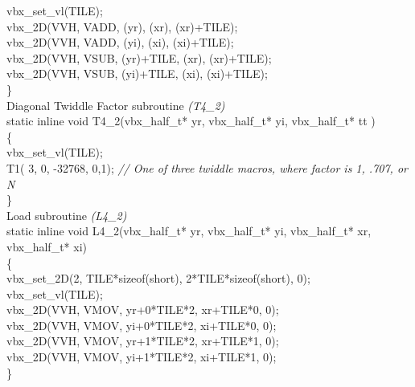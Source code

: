 \documentclass[11pt]{article}
\begin{document}
	\indent vbx\_set\_vl(TILE);\\
	\indent vbx\_2D(VVH, VADD, (yr),        (xr),        (xr)+TILE);\\
	\indent vbx\_2D(VVH, VADD, (yi),        (xi),        (xi)+TILE);\\
	\indent vbx\_2D(VVH, VSUB, (yr)+TILE,   (xr),        (xr)+TILE);\\
	\indent vbx\_2D(VVH, VSUB, (yi)+TILE,   (xi),        (xi)+TILE);\\
\}\\
\newline
Diagonal Twiddle Factor subroutine \emph{(T4\_2)}
\noindent\makebox[\linewidth]{\rule{\textwidth}{1pt}} \\
\newline
static inline void T4\_2(vbx\_half\_t* yr, vbx\_half\_t* yi, vbx\_half\_t* tt )\\
\{\\
	\indent vbx\_set\_vl(TILE);\\
	\indent T1( 3,    0, -32768, 0,1); \emph{// One of three twiddle macros, where factor is 1, .707, or N}\\
\}\\
\newline
Load subroutine \emph{(L4\_2)}
\noindent\makebox[\linewidth]{\rule{\textwidth}{1pt}} \\
\newline
static inline void L4\_2(vbx\_half\_t* yr, vbx\_half\_t* yi, vbx\_half\_t* xr, vbx\_half\_t* xi)\\
\{\\
	\indent vbx\_set\_2D(2, TILE*sizeof(short), 2*TILE*sizeof(short), 0);\\
	\indent vbx\_set\_vl(TILE);\\
	\indent vbx\_2D(VVH, VMOV, yr+0*TILE*2, xr+TILE*0, 0);\\
	\indent vbx\_2D(VVH, VMOV, yi+0*TILE*2, xi+TILE*0, 0);\\
	\indent vbx\_2D(VVH, VMOV, yr+1*TILE*2, xr+TILE*1, 0);\\
	\indent vbx\_2D(VVH, VMOV, yi+1*TILE*2, xi+TILE*1, 0);\\
\}\\

\newpage
\end{document}
